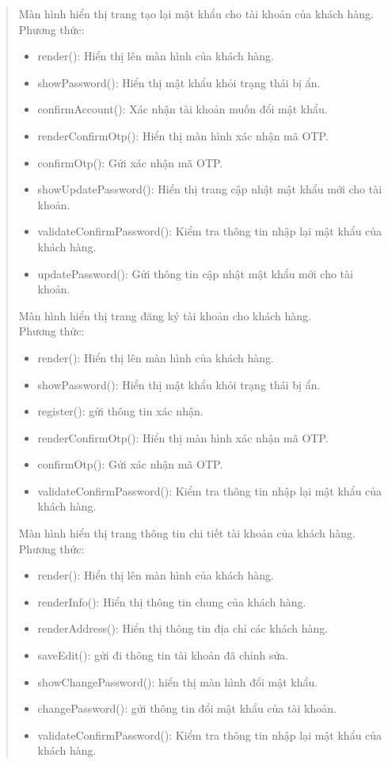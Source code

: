 \begin{quote}
	Màn hình hiển thị trang tạo lại mật khẩu cho tài khoản của khách hàng.\\
	Phương thức:
	\begin{itemize}
		\item render(): Hiển thị lên màn hình của khách hàng.
		\item showPassword(): Hiển thị mật khẩu khỏi trạng thái bị ẩn.
		\item confirmAccount(): Xác nhận tài khoản muốn đổi mật khẩu.
		\item renderConfirmOtp(): Hiển thị màn hình xác nhận mã OTP.
		\item confirmOtp(): Gửi xác nhận mã OTP.
		\item showUpdatePassword(): Hiển thị trang cập nhật mật khẩu mới cho tài khoản.
		\item validateConfirmPassword(): Kiểm tra thông tin nhập lại mật khẩu của khách hàng.
		\item updatePassword(): Gửi thông tin cập nhật mật khẩu mới cho tài khoản.
	\end{itemize}

	Màn hình hiển thị trang đăng ký tài khoản cho khách hàng.\\
	Phương thức:
	\begin{itemize}
		\item render(): Hiển thị lên màn hình của khách hàng.
		\item showPassword(): Hiển thị mật khẩu khỏi trạng thái bị ẩn.
		\item register(): gửi thông tin xác nhận.
		\item renderConfirmOtp(): Hiển thị màn hình xác nhận mã OTP.
		\item confirmOtp(): Gửi xác nhận mã OTP.
		\item validateConfirmPassword(): Kiểm tra thông tin nhập lại mật khẩu của khách hàng.
	\end{itemize}

	Màn hình hiển thị trang thông tin chi tiết tài khoản của khách hàng.\\
	Phương thức:
	\begin{itemize}
		\item render(): Hiển thị lên màn hình của khách hàng.
		\item renderInfo(): Hiển thị thông tin chung của khách hàng.
		\item renderAddress(): Hiển thị thông tin địa chỉ các khách hàng.
		\item saveEdit(): gửi đi thông tin tài khoản đã chỉnh sửa.
		\item showChangePassword(): hiển thị màn hình đổi mật khẩu.
		\item changePassword(): gửi thông tin đổi mật khẩu của tài khoản.
		\item validateConfirmPassword(): Kiểm tra thông tin nhập lại mật khẩu của khách hàng.
	\end{itemize}

\end{quote}

